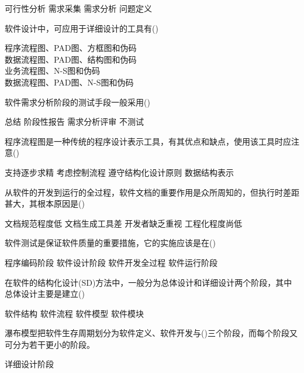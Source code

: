 \documentclass{exam}
\begin{document}
\begin{questions}
\begin{oneparchoices}
		\choice 可行性分析
		\choice 需求采集
		\choice 需求分析
		\correctchoice 问题定义
	\end{oneparchoices}
	\question 软件设计中，可应用于详细设计的工具有()\\
	\begin{oneparchoices}
		\correctchoice 程序流程图、PAD图、方框图和伪码\\
		\choice 数据流程图、PAD图、结构图和伪码\\
		\choice 业务流程图、N-S图和伪码\\
		\choice 数据流程图、PAD图、N-S图和伪码
	\end{oneparchoices}
	\question 软件需求分析阶段的测试手段一般采用()\\
	\begin{oneparchoices}
		\choice 总结
		\choice 阶段性报告
		\correctchoice 需求分析评审
		\choice 不测试
	\end{oneparchoices}
	\question 程序流程图是一种传统的程序设计表示工具，有其优点和缺点，使用该工具时应注意()\\
	\begin{oneparchoices}
		\choice 支持逐步求精
		\choice 考虑控制流程
		\correctchoice 遵守结构化设计原则
		\choice 数据结构表示
	\end{oneparchoices}
	\question 从软件的开发到运行的全过程，软件文档的重要作用是众所周知的，但执行时差距甚大，其根本原因是()\\
	\begin{oneparchoices}
		\choice 文档规范程度低
		\choice 文档生成工具差
		\choice 开发者缺乏重视
		\correctchoice 工程化程度尚低
	\end{oneparchoices}
	\question 软件测试是保证软件质量的重要措施，它的实施应该是在()\\
	\begin{oneparchoices}
		\choice 程序编码阶段
		\choice 软件设计阶段
		\correctchoice 软件开发全过程
		\choice 软件运行阶段
	\end{oneparchoices}
	\question 在软件的结构化设计(SD)方法中，一般分为总体设计和详细设计两个阶段，其中总体设计主要是建立()\\
	\begin{oneparchoices}
		\correctchoice 软件结构
		\choice 软件流程
		\choice 软件模型
		\choice 软件模块
	\end{oneparchoices}
	\question 瀑布模型把软件生存周期划分为软件定义、软件开发与()三个阶段，而每个阶段又可分为若干更小的阶段。\\
	\begin{oneparchoices}
		\choice 详细设计阶段

\end{oneparchoices}
\end{questions}
\end{document}

